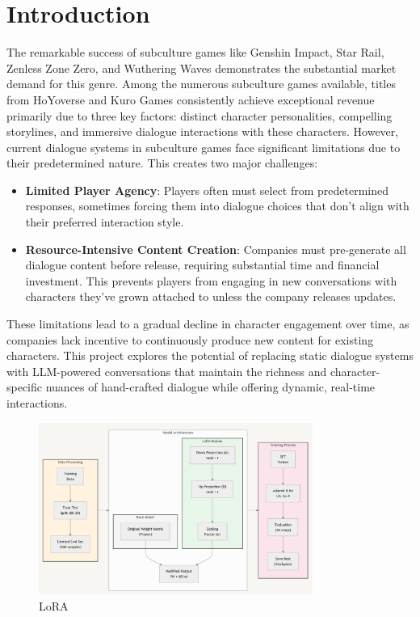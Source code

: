 \documentclass{article}
\begin{document}
\section{Introduction}
The remarkable success of subculture games like Genshin Impact, Star Rail, Zenless Zone Zero, and Wuthering Waves demonstrates the substantial market demand for this genre. Among the numerous subculture games available, titles from HoYoverse and Kuro Games consistently achieve exceptional revenue primarily due to three key factors: distinct character personalities, compelling storylines, and immersive dialogue interactions with these characters.
However, current dialogue systems in subculture games face significant limitations due to their predetermined nature. This creates two major challenges:
\begin{itemize}
\item \textbf{Limited Player Agency}: Players often must select from predetermined responses, sometimes forcing them into dialogue choices that don't align with their preferred interaction style.
\item \textbf{Resource-Intensive Content Creation}: Companies must pre-generate all dialogue content before release, requiring substantial time and financial investment. This prevents players from engaging in new conversations with characters they've grown attached to unless the company releases updates.
\end{itemize}
These limitations lead to a gradual decline in character engagement over time, as companies lack incentive to continuously produce new content for existing characters. This project explores the potential of replacing static dialogue systems with LLM-powered conversations that maintain the richness and character-specific nuances of hand-crafted dialogue while offering dynamic, real-time interactions.



\graphicspath{ {./images/} }

\begin{figure}[t]  %
    \centering
    \includegraphics[width=0.8\textwidth]{./lora_model}
    \caption{LoRA}
    \label{fig:lora-model}
\end{figure}
\end{document}
